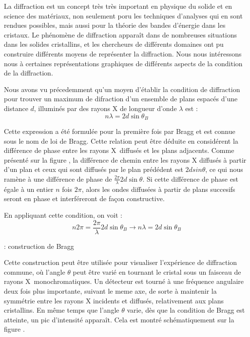 La diffraction est un concept très très important en physique du solide et en
science des matériaux, non seulement poru les techniques d'analyses qui en sont
rendues possibles, mais aussi pour la théorie des bandes d'énergie dans les
cristaux. Le phénomène de diffraction apparaît dans de nombreuses situations dans
les solides cristallins, et les chercheurs de différents domaines ont pu
construire différents moyens de représenter la diffraction. Nous nous intéressons
nous à certaines représentations graphiques de différents aspects de la
condition de la diffraction.

Nous avons vu précedemment qu'un moyen d'établir la condition de diffraction pour
trouver un maximum de difraction d'un ensemble de plans espacés d'une distance
$d$, illuminés par des rayons X de longueur d'onde $\lambda$ est :
\begin{equation}
    n \lambda = 2d \sin \theta_B
\end{equation}

Cette expression a été formulée pour la première fois par Bragg et est connue
sous le nom de loi de Bragg. Cette relation peut être déduite en considérent la
différence de phase entre les rayons X diffusés et les plans adjacents. Comme
présenté sur la figure \TODO, la différence de chemin entre les rayons X diffusés
à partir d'un plan et ceux qui sont diffusés par le plan prédédent est
$2d sin \theta$, ce qui nous ramène à une différence de phase de
$\frac{2\pi}{\lambda} 2d \sin \theta$. Si cette différence de phase est égale à
un entier $n$ fois $2\pi$, alors les ondes diffusées à partir de plans succesifs
seront en phase et interféreront de façon constructive.

En appliquant cette condition, on voit :
\begin{equation}
    n 2 \pi = \frac{2 \pi}{\lambda} 2d\sin \theta_B \rightarrow
    n\lambda = 2d \sin \theta_B
\end{equation}

\TODO: construction de Bragg

Cette construction peut être utilisée pour visualiser l'expérience de diffraction
commune, où l'angle $\theta$ peut être varié en tournant le cristal sous un
faisceau de rayons X monochromatiques. Un détecteur est tourné à une fréquence
angulaire deux fois plus importante, suivant le meme axe, de sorte à maintenir la
symmétrie entre les rayons X incidents et diffusés, relativement aux plans
cristallins. En même temps que l'angle $\theta$ varie, dès que la condition de
Bragg est atteinte, un pic d'intensité apparaît. Cela est montré schématiquement
sur la figure \TODO.

